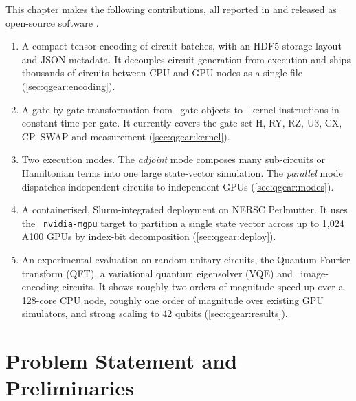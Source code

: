 This chapter makes the following contributions, all reported in \cite{guo2025qgear} and released as open-source software \cite{guo2025qgearsoftware}.
\begin{enumerate}
  \item A compact tensor encoding of circuit batches, with an HDF5 storage layout and JSON metadata. It decouples circuit generation from execution and ships thousands of circuits between CPU and GPU nodes as a single file (\cref{sec:qgear:encoding}).
  \item A gate-by-gate transformation from \qiskit\ gate objects to \cudaq\ kernel instructions in constant time per gate. It currently covers the gate set H, RY, RZ, U3, CX, CP, SWAP and measurement (\cref{sec:qgear:kernel}).
  \item Two execution modes. The \emph{adjoint} mode composes many sub-circuits or Hamiltonian terms into one large state-vector simulation. The \emph{parallel} mode dispatches independent circuits to independent GPUs (\cref{sec:qgear:modes}).
  \item A containerised, Slurm-integrated deployment on NERSC Perlmutter. It uses the \cudaq\ \texttt{nvidia-mgpu} target to partition a single state vector across up to 1,024 A100 GPUs by index-bit decomposition (\cref{sec:qgear:deploy}).
  \item An experimental evaluation on random unitary circuits, the Quantum Fourier transform (QFT), a variational quantum eigensolver (VQE) and \qcrank\ image-encoding circuits. It shows roughly two orders of magnitude speed-up over a 128-core CPU node, roughly one order of magnitude over existing GPU simulators, and strong scaling to 42 qubits (\cref{sec:qgear:results}).
\end{enumerate}

\section{Problem Statement and Preliminaries}\label{sec:qgear:problem}


